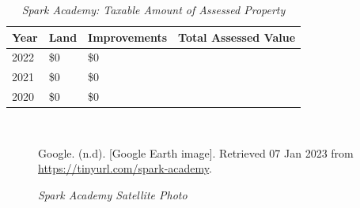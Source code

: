 \begin{table}[hbtp]
  \SingleSpacing%
  \caption[Spark Academy: Taxable Amount of Assessed Propery]{\textit{Spark Academy: Taxable Amount of Assessed Property}}%
  \label{tab:spark-academy-taxable-amount}
  \begin{tabular}{llll}
    \toprule
    Year & Land        & Improvements & Total Assessed Value \\
    \midrule
    2022 & \$0         & \$0          & \\
    2021 & \$0         & \$0          & \\
    2020 & \$0         & \$0          & \\
    \bottomrule
  \end{tabular}\\
\end{table}

\begin{figure}[hbtp]
  \caption[Spark Academy Satellite Photo] {\textit{Spark Academy Satellite Photo}}%
  \label{fig:spark-academy-sat-photo}
  {Google. (n.d). [Google Earth image]. Retrieved 07 Jan 2023 from \url{https://tinyurl.com/spark-academy}.}
\end{figure}


